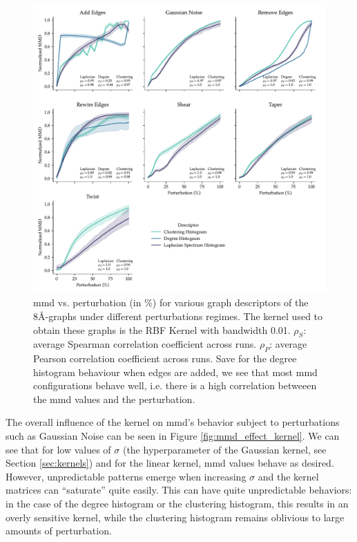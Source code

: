 \begin{figure}[!htbp]
  \centering
  \includegraphics[width=\textwidth]{./figures/results/res_1_1.pdf}
  \caption[Overall behaviour of \acrshort{mmd} using graph-based descriptors.]{\acrshort{mmd} vs.
    perturbation (in \%) for various graph descriptors of the 8\si{\angstrom}-graphs
    under different perturbations regimes. The kernel used to obtain these graphs is
    the RBF Kernel with bandwidth 0.01. $\rho_{S}$: average Spearman correlation
    coefficient across runs. $\rho_{P}$: average Pearson correlation coefficient
    across runs. Save for the degree histogram behaviour when edges are added, we
    see that most \acrshort{mmd} configurations behave well, i.e. there is a high correlation
    betweeen the \acrshort{mmd} values and the perturbation.}
  \label{fig:mmd_consistent_eps}
\end{figure}

The overall influence of the kernel on \acrshort{mmd}'s behavior subject to perturbations
such as Gaussian Noise can be seen in Figure \ref{fig:mmd_effect_kernel}. We
can see that for low values of $\sigma$ (the hyperparameter of the Gaussian
kernel, see Section \ref{sec:kernels}) and for the linear kernel, \acrshort{mmd} values
behave as desired. However, unpredictable patterns emerge when increasing
$\sigma$ and the kernel matrices can ``saturate'' quite easily. This can have
quite unpredictable behaviors: in the case of the degree histogram or the
clustering histogram, this results in an overly sensitive kernel, while the
clustering histogram remains oblivious to large amounts of perturbation.

